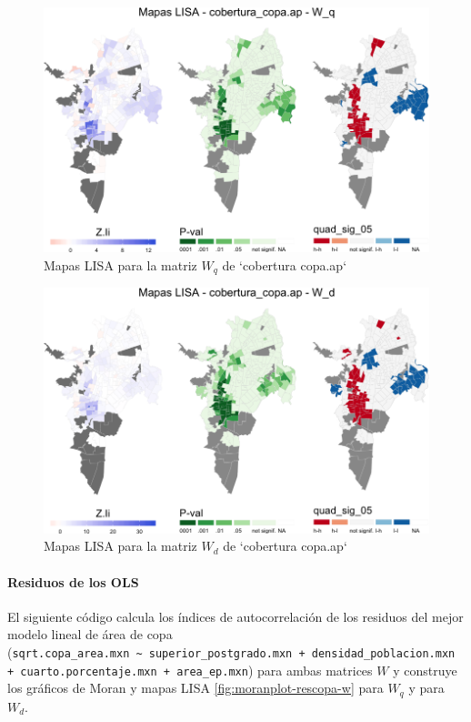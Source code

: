 \documentclass[12pt,]{book}
\let\oldparagraph\paragraph
\renewcommand{\paragraph}[1]{\oldparagraph{#1}\mbox{}}
\begin{document}
\begin{figure}
\includegraphics[width=1\linewidth]{tesis-unigis_files/figure-latex/mapas-lisa-copaap-wq-1} \caption{Mapas LISA para la matriz $W_q$ de `cobertura copa.ap`}\label{fig:mapas-lisa-copaap-wq}
\end{figure}

\begin{figure}
\includegraphics[width=1\linewidth]{tesis-unigis_files/figure-latex/mapas-lisa-copaap-wd-1} \caption{Mapas LISA para la matriz $W_d$ de `cobertura copa.ap`}\label{fig:mapas-lisa-copaap-wd}
\end{figure}

\paragraph{Residuos de los OLS}\label{residuos-de-los-ols}

El siguiente código calcula los índices de autocorrelación de los
residuos del mejor modelo lineal de área de copa
(\texttt{sqrt.copa\_area.mxn\ \textasciitilde{}\ superior\_postgrado.mxn\ +\ densidad\_poblacion.mxn\ +\ cuarto.porcentaje.mxn\ +\ area\_ep.mxn})
para ambas matrices \(W\) y construye los gráficos de Moran y mapas LISA
\ref{fig:moranplot-rescopa-w} para \(W_q\) y para \(W_d\).
\end{document}
